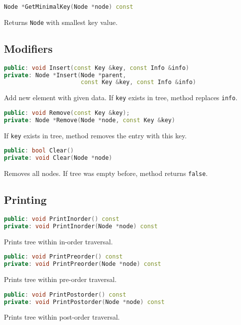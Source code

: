 \documentclass{article}
\begin{document}
\begin{lstlisting}[language=C++]
Node *GetMinimalKey(Node *node) const
\end{lstlisting}
Returns {\tt Node} with smallest key value.
\vspace{\baselineskip}

\subsection{Modifiers}

\begin{lstlisting}[language=C++]
public: void Insert(const Key &key, const Info &info)
private: Node *Insert(Node *parent, 
                      const Key &key, const Info &info)
\end{lstlisting}
Add new element with given data. If {\tt key} exists in tree, method replaces {\tt info}.

\begin{lstlisting}[language=C++]
public: void Remove(const Key &key);
private: Node *Remove(Node *node, const Key &key)
\end{lstlisting}
If {\tt key} exists in tree, method removes the entry with this key.

\begin{lstlisting}[language=C++]
public: bool Clear()
private: void Clear(Node *node)
\end{lstlisting}
Removes all nodes. If tree was empty before, method returns {\tt false}.
\vspace{\baselineskip}

\subsection{Printing}

\begin{lstlisting}[language=C++]
public: void PrintInorder() const
private: void PrintInorder(Node *node) const
\end{lstlisting}
Prints tree within in-order traversal.

\begin{lstlisting}[language=C++]
public: void PrintPreorder() const
private: void PrintPreorder(Node *node) const
\end{lstlisting}
Prints tree within pre-order traversal.

\begin{lstlisting}[language=C++]
public: void PrintPostorder() const
private: void PrintPostorder(Node *node) const
\end{lstlisting}
Prints tree within post-order traversal.
\newpage
\end{document}
